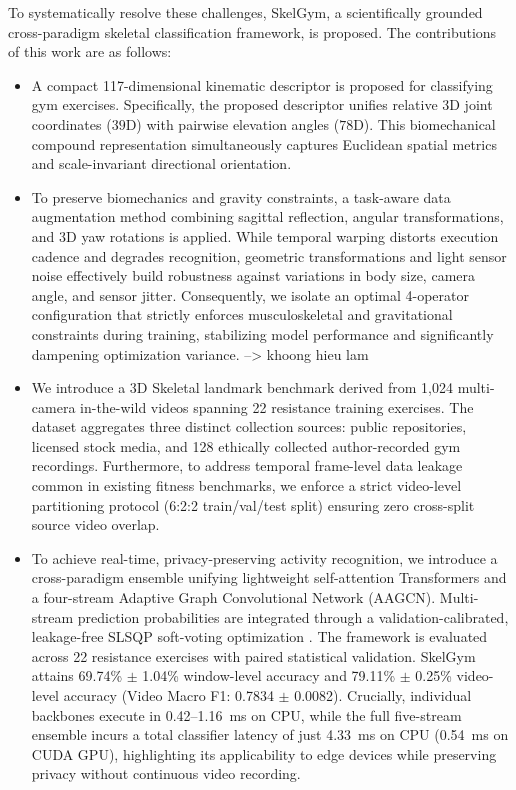 \documentclass[preprint,12pt]{elsarticle}
\newcommand{\rv}[1]{{\color{red}#1}}
\begin{document}
To systematically resolve these challenges, SkelGym, a scientifically grounded cross-paradigm skeletal classification framework, is proposed. 
The contributions of this work are as follows:
\begin{itemize}
    \item A compact 117-dimensional kinematic descriptor is proposed for classifying gym exercises.
    Specifically, the proposed descriptor unifies relative 3D joint coordinates ($39\text{D}$) with pairwise elevation angles ($78\text{D}$). 
    This biomechanical compound representation simultaneously captures Euclidean spatial metrics and scale-invariant directional orientation.
    \item To preserve biomechanics and gravity constraints, a task-aware data augmentation method combining sagittal reflection, angular transformations, and 3D yaw rotations is applied. %
    While temporal warping distorts execution cadence and degrades recognition, geometric transformations and light sensor noise effectively build robustness against variations in body size, camera angle, and sensor jitter.
    \rv{Consequently, we isolate an optimal 4-operator configuration that strictly enforces musculoskeletal and gravitational constraints during training, stabilizing model performance and significantly dampening optimization variance. --> khoong hieu lam}
    \item We introduce a 3D Skeletal landmark benchmark derived from 1,024 multi-camera in-the-wild videos spanning 22 resistance training exercises.
    The dataset aggregates three distinct collection sources: public repositories, licensed stock media, and 128 ethically collected author-recorded gym recordings.
    Furthermore, to address temporal frame-level data leakage common in existing fitness benchmarks, we enforce a strict video-level partitioning protocol (6:2:2 train/val/test split) ensuring zero cross-split source video overlap.
    \item To achieve real-time, privacy-preserving activity recognition, we introduce a cross-paradigm ensemble unifying lightweight self-attention Transformers and a four-stream Adaptive Graph Convolutional Network (AAGCN).
    Multi-stream prediction probabilities are integrated through a validation-calibrated, leakage-free SLSQP soft-voting optimization \cite{kraft1988,virtanen2020}.
    The framework is evaluated across 22 resistance exercises with paired statistical validation. 
    SkelGym attains 69.74\% $\pm$ 1.04\% window-level accuracy and 79.11\% $\pm$ 0.25\% video-level accuracy (Video Macro F1: 0.7834 $\pm$ 0.0082).
    Crucially, individual backbones execute in 0.42–1.16~ms on CPU, while the full five-stream ensemble incurs a total classifier latency of just 4.33~ms on CPU (0.54~ms on CUDA GPU), highlighting its applicability to edge devices while preserving privacy without continuous video recording.
\end{itemize}
\end{document}
